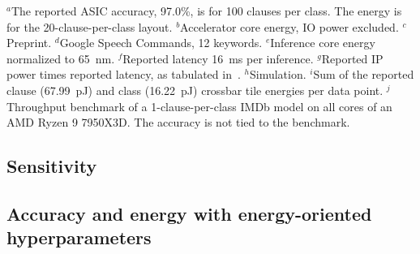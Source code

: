 \begin{table}
\footnotesize
\setlength{\tabcolsep}{4pt}
\centering
\caption{Published TM inference hardware and predicted 7~nm \gainp{}. Energy and throughput as reported by each design. n/r: not reported. Model: TM variant, with clauses per class in parentheses. For \gainp{}, energy includes the controller, excludes input loading and model-SRAM leakage, and is given at the conservative and optimistic corners. Throughput is given at the conservative corner for one 256-subarray macro, with its area including the model SRAM.}
\label{tab:tmhw}


\vspace{4pt}
\parbox{0.95\textwidth}{\raggedright $^{a}$The reported ASIC accuracy, 97.0\%, is for 100 clauses per class. The energy is for the 20-clause-per-class layout. $^{b}$Accelerator core energy, IO power excluded. $^{c}$Preprint. $^{d}$Google Speech Commands, 12 keywords. $^{e}$Inference core energy normalized to 65~nm. $^{f}$Reported latency 16~ms per inference. $^{g}$Reported IP power times reported latency, as tabulated in~\cite{tunheim2026asic}. $^{h}$Simulation. $^{i}$Sum of the reported clause (67.99~pJ) and class (16.22~pJ) crossbar tile energies per data point. $^{j}$Throughput benchmark of a 1-clause-per-class IMDb model on all cores of an AMD Ryzen 9 7950X3D. The accuracy is not tied to the benchmark.}
\end{table}

\subsection{Sensitivity}\label{sec:sens}


\subsection{Accuracy and energy with energy-oriented hyperparameters}\label{sec:energyhp}

